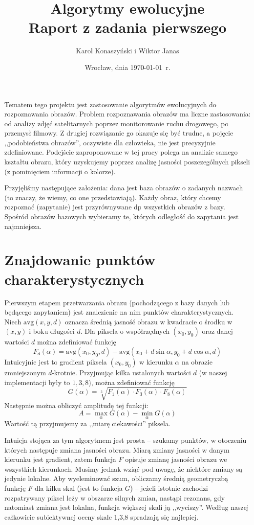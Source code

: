 \documentclass[a4paper,12pt,leqno]{article}
\title{\textbf{Algorytmy ewolucyjne}\\
       {\Large Raport z zadania pierwszego}\\[-1ex]}
\author{Karol Konaszyński i Wiktor Janas}
\date{Wrocław, dnia \today\ r.}
\begin{document}
\maketitle

\newcommand{\avg}{\mathrm{avg}}
\newcommand{\dist}{\mathrm{dist}}
\newcommand{\median}{\mathrm{median}}
\newcommand{\target}{\mathrm{target}}
\newcommand{\RETURN}{|return|\ }

Tematem tego projektu jest zastosowanie algorytmów ewolucyjnych do rozpoznawania obrazów. 
Problem rozpoznawania obrazów ma liczne zastosowania: od analizy zdjęć satelitarnych poprzez monitorowanie ruchu drogowego, po przemysł filmowy.
Z drugiej rozwiązanie go okazuje się być trudne, a pojęcie ,,podobieństwa obrazów'', oczywiste dla człowieka, nie jest precyzyjnie zdefiniowane.
Podejście zaproponowane w tej pracy polega na analizie samego kształtu obrazu, który uzyskujemy poprzez analizę jasności poszczególnych
pikseli (z pominięciem informacji o kolorze).

Przyjęliśmy następujące założenia: dana jest baza obrazów o zadanych nazwach (to znaczy, że wiemy, co one przedstawiają).
Każdy obraz, który chcemy rozpoznać (zapytanie) jest przyrównywane dp wszystkich obrazów z bazy.
Spośród obrazów bazowych wybieramy te, których odległość do zapytania jest najmniejsza.

\section{Znajdowanie punktów charakterystycznych}
Pierwszym etapem przetwarzania obrazu (pochodzącego z bazy danych lub będącego zapytaniem) jest znalezienie na nim punktów charakterystycznych.
Niech $\avg(x,y,d)$ oznacza średnią jasność obrazu w kwadracie o środku w $(x,y)$ i boku długości $d$. Dla piksela o współrzędnych $(x_0,y_0)$ oraz danej
wartości $d$ można zdefiniować funkcję
\[ F_d(\alpha) = \avg(x_0,y_0,d) - \avg( x_0+d\sin\alpha, y_0+d\cos\alpha, d) \]
Intuicyjnie jest to gradient piksela $(x_0,y_0)$ w kierunku $\alpha$ na obrazie zmniejszonym $d$-krotnie. Przyjmując kilka ustalonych wartości $d$
(w naszej implementacji były to $1,3,8$), można zdefiniować funkcję
\[ G(\alpha) = \sqrt[3]{F_1(\alpha) \cdot F_3(\alpha) \cdot F_8(\alpha)} \]
Następnie można obliczyć amplitudę tej funkcji:
\[ A = \max_\alpha G(\alpha) - \min_\alpha G(\alpha) \]
Wartość tą przyjmujemy za ,,miarę ciekawości'' piksela. 

Intuicja stojąca za tym algorytmem jest prosta -- szukamy punktów, w otoczeniu których następuje zmiana jasności obrazu. Miarą zmiany jasności w danym
kierunku jest gradient, zatem funkcja $F$ opisuje zmianę jasności obrazu we wszystkich kierunkach. Musimy jednak wziąć pod uwagę, że niektóre zmiany są
jedynie lokalne. Aby wyeleminować szum, obliczamy średnią geometryczbą funkcję $F$ dla kilku skal (jest to funkcja $G$) -- jeżeli istotnie zachodzi
rozpatrywany piksel leży w obszarze silnych zmian, nastąpi rezonans, gdy natomiast zmiana jest lokalna, funkcja większej skali ją ,,wyciszy''.
Według naszej całkowicie subiektywnej oceny skale 1,3,8 spradzają się najlepiej.
\end{document}
